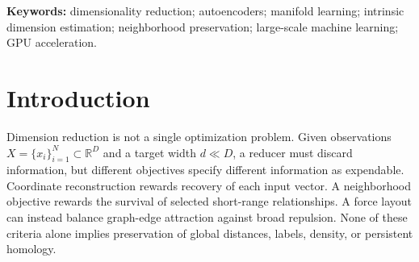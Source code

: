 \documentclass[10pt]{article}
\newcommand{\R}{\mathbb{R}}
\begin{document}
\begin{abstract}
On Deep1B, the autoencoder gives bounded-state, approximately linear one-pass processing
from 10 to 100 million rows.  UMAP completes at 100 million with 78.34 GB of sampled total
GPU-process memory, while the tested DiRe fit fails on a 102.4 GB allocation.  Within the
fixed 10-million-row control, increasing distinct training rows from 65,536 to 9.86 million
at a common 1,204-update budget changes legacy-evaluation NMSE by only 0.20\%; observed
pool differences are therefore small under this short protocol.  Yet a frozen tune-only
sweep finds
no qualifying plateau under its prespecified NMSE flatness rule through 9,632 updates and
shows a descriptive pool-by-budget separation: the one-million-row pool ends at lower tune
NMSE than the 65,536-row pool (.3956 versus .4060).  Strict-ID recall
remains low---Recall@10 and Recall@100 are .0358 and .0677 for the 10-million-row one-pass
layout---so systems scalability is not nearest-neighbor adequacy.  These are
implementation- and protocol-specific observations.

The sampled topology comparison is similarly conditional on corpus and width.  DiRe
leads both Betti-curve discrepancies for arXiv at width two; at width eight the
autoencoder leads $\beta_0$ and DiRe leads $\beta_1$.  On Wikipedia, DiRe leads
$\beta_0$ and the autoencoder leads $\beta_1$ at width two, while the autoencoder leads
both at width eight.  A paired BF16-autocast sensitivity check preserves reconstruction
and shared-metric quality under prespecified practical margins.  It nearly halves
Wikipedia training time, but slightly slows the smaller arXiv network, showing that
mixed-precision speedup depends on whether dense computation amortizes its overhead.
\end{abstract}

\noindent\textbf{Keywords:} dimensionality reduction; autoencoders; manifold learning;
intrinsic dimension estimation; neighborhood preservation; large-scale machine learning;
GPU acceleration.

\section{Introduction}

Dimension reduction is not a single optimization problem.  Given observations
$X=\{x_i\}_{i=1}^N\subset\R^D$ and a target width $d\ll D$, a reducer must discard
information, but different objectives specify different information as expendable.
Coordinate reconstruction rewards recovery of each input vector.  A neighborhood
objective rewards the survival of selected short-range relationships.  A force layout
can instead balance graph-edge attraction against broad repulsion.  None of these
criteria alone implies preservation of global distances, labels, density, or persistent
homology.
\end{document}
